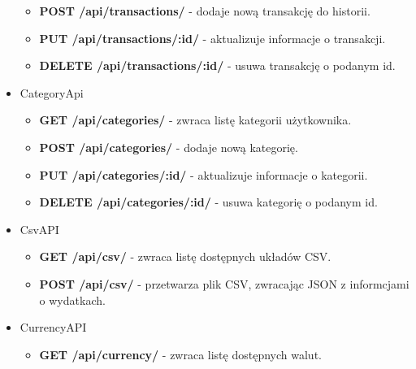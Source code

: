 \documentclass{article}
\begin{document}
\begin{itemize}
\begin{itemize}
				\item \textbf{POST /api/transactions/} - dodaje nową transakcję do historii.

				\item \textbf{PUT /api/transactions/:id/} - aktualizuje informacje o transakcji.

				\item \textbf{DELETE /api/transactions/:id/} - usuwa transakcję o podanym id.
			\end{itemize}




		\item CategoryApi
			\begin{itemize}
				\item \textbf{GET /api/categories/} - zwraca listę kategorii użytkownika.

				\item \textbf{POST /api/categories/} - dodaje nową kategorię.

				\item \textbf{PUT /api/categories/:id/} - aktualizuje informacje o kategorii.

				\item \textbf{DELETE /api/categories/:id/} - usuwa kategorię o podanym id.
			\end{itemize}
		\item CsvAPI
			\begin{itemize}
				\item \textbf{GET /api/csv/} - zwraca listę dostępnych układów CSV.

				\item \textbf{POST /api/csv/} - przetwarza plik CSV, zwracając JSON z informcjami o wydatkach.
			\end{itemize}
		\item CurrencyAPI
			\begin{itemize}
				\item \textbf{GET /api/currency/} - zwraca listę dostępnych walut.
			\end{itemize}


\end{itemize}
\end{document}
